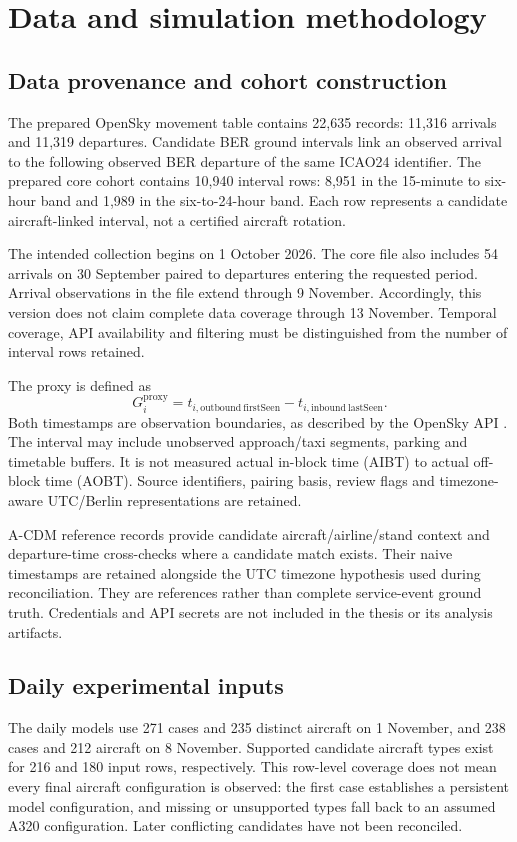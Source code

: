 \chapter{Data and simulation methodology}
\label{ch:methods}

\section{Data provenance and cohort construction}
The prepared OpenSky movement table contains 22,635 records: 11,316 arrivals and 11,319 departures. Candidate BER ground intervals link an observed arrival to the following observed BER departure of the same ICAO24 identifier. The prepared core cohort contains 10,940 interval rows: 8,951 in the 15-minute to six-hour band and 1,989 in the six-to-24-hour band. Each row represents a candidate aircraft-linked interval, not a certified aircraft rotation.

The intended collection begins on 1 October 2026. The core file also includes 54 arrivals on 30 September paired to departures entering the requested period. Arrival observations in the file extend through 9 November. Accordingly, this version does not claim complete data coverage through 13 November. Temporal coverage, API availability and filtering must be distinguished from the number of interval rows retained.

The proxy is defined as
\begin{equation}
G_i^{\mathrm{proxy}}=t_{i,\mathrm{outbound\ firstSeen}}-t_{i,\mathrm{inbound\ lastSeen}}.
\end{equation}
Both timestamps are observation boundaries, as described by the OpenSky API \cite{opensky_rest}. The interval may include unobserved approach/taxi segments, parking and timetable buffers. It is not measured actual in-block time (AIBT) to actual off-block time (AOBT). Source identifiers, pairing basis, review flags and timezone-aware UTC/Berlin representations are retained.

A-CDM reference records provide candidate aircraft/airline/stand context and departure-time cross-checks where a candidate match exists. Their naive timestamps are retained alongside the UTC timezone hypothesis used during reconciliation. They are references rather than complete service-event ground truth. Credentials and API secrets are not included in the thesis or its analysis artifacts.

\section{Daily experimental inputs}
The daily models use 271 cases and 235 distinct aircraft on 1 November, and 238 cases and 212 aircraft on 8 November. Supported candidate aircraft types exist for 216 and 180 input rows, respectively. This row-level coverage does not mean every final aircraft configuration is observed: the first case establishes a persistent model configuration, and missing or unsupported types fall back to an assumed A320 configuration. Later conflicting candidates have not been reconciled.

